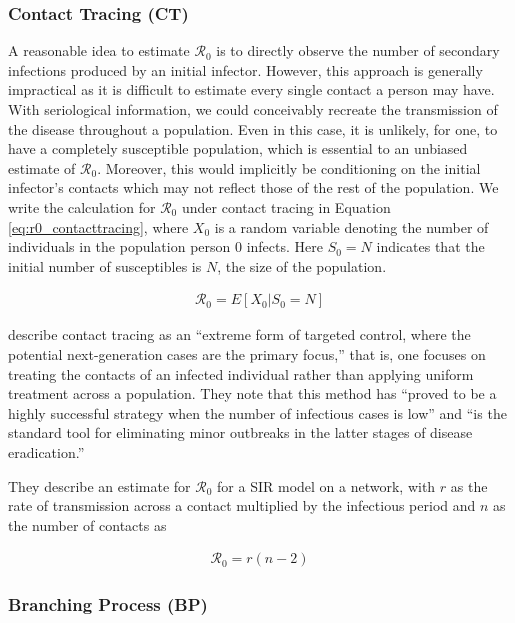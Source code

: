 \documentclass[12pt]{article}
\newcommand{\rr}{\ensuremath{\mathcal{R}_0}}
\begin{document}
\label{sec:network}

\subsubsection{Contact Tracing (CT)}
\label{sec:contact_tracing}
A reasonable idea to estimate $\rr$ is to directly observe the number of secondary infections produced by an initial infector.  However, this approach is generally impractical as it is difficult to estimate every single contact a person may have.   With seriological information, we could conceivably recreate the transmission of the disease throughout a population.  Even in this case, it is unlikely, for one, to have a completely susceptible population, which is essential to an unbiased estimate of $\rr$.  Moreover, this would implicitly be conditioning on the initial infector's contacts which may not reflect those of the rest of the population.  We write the calculation for $\rr$ under contact tracing in Equation \ref{eq:r0_contacttracing}, where $X_0$ is a random variable denoting the number of individuals in the population person 0 infects.  Here $S_0=N$ indicates that the initial number of susceptibles is $N$, the size of the population.

\begin{align}\label{eq:r0_contacttracing}
\rr = E[ X_0 | S_0 = N]
\end{align}

\cite{eames2003} describe contact tracing as an ``extreme form of targeted control, where the potential next-generation cases are the primary focus,'' that is, one focuses on treating the contacts of an infected individual rather than applying uniform treatment across a population.  They note that this method has ``proved to be a highly successful strategy when the number of infectious cases is low'' and ``is the standard tool for eliminating minor outbreaks in the latter stages of disease eradication.''

They describe an estimate for $\rr$ for a SIR model on a network, with $r$ as the rate of transmission across a contact multiplied by the infectious period and $n$ as the number of contacts as

\begin{align*}
\rr = r(n-2)
\end{align*}



\subsubsection{Branching Process (BP)}
\label{sec:branching-process}
\end{document}
